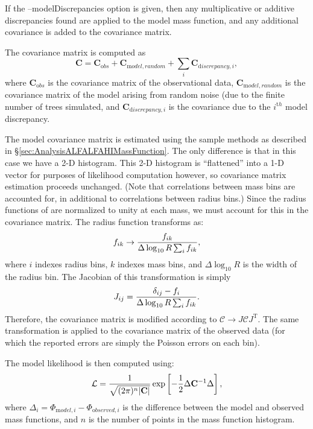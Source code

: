 If the {\normalfont \ttfamily --modelDiscrepancies} option is given, then any multiplicative or additive discrepancies found are applied to the model mass function, and any additional covariance is added to the covariance matrix.

The covariance matrix is computed as
\begin{equation}
 {\mathbf C} = {\mathbf C}_{\mathrm obs} + {\mathbf C}_{\mathrm model,random} + \sum_i {\mathbf C}_{{\mathrm discrepancy}, i},
\end{equation}
where ${\mathbf C}_{\mathrm obs}$ is the covariance matrix of the observational data, ${\mathbf C}_{\mathrm model,random}$ is the covariance matrix of the model arising from random noise (due to the finite number of trees simulated, and ${\mathbf C}_{{\mathrm discrepancy}, i}$ is the covariance due to the $i^{\mathrm th}$ model discrepancy.

The model covariance matrix is estimated using the sample methods as described in \S\ref{sec:AnalysisALFALFAHIMassFunction}. The only difference is that in this case we have a 2-D histogram. This 2-D histogram is ``flattened'' into a 1-D vector for purposes of likelihood computation however, so covariance matrix estimation proceeds unchanged. (Note that correlations between mass bins are accounted for, in additional to correlations between radius bins.) Since the radius functions of \cite{shen_size_2003} are normalized to unity at each mass, we must account for this in the covariance matrix. The radius function transforms as:
\begin{equation}
 f_{ik} \rightarrow {f_{ik} \over \Delta \log_{10} R \sum_i f_{ik} },
\end{equation}
where $i$ indexes radius bins, $k$ indexes mass bins, and $\Delta \log_{10} R$ is the width of the radius bin. The Jacobian of this transformation is simply
\begin{equation}
 J_{ij} = {\delta_{ij} - f_i \over  \Delta \log_{10} R \sum_i f_{ik}}.
\end{equation}
Therefore, the covariance matrix is modified according to $\mathcal{C} \rightarrow J \mathcal{C} J^{\mathrm T}$. The same transformation is applied to the covariance matrix of the observed data (for which the reported errors are simply the Poisson errors on each bin).

The model likelihood is then computed using:
\begin{equation}
 \mathcal{L} = {1 \over \sqrt{(2 \pi)^n |{\mathbf C}|}} \exp\left[ -{1\over 2} \Delta {\mathbf C}^{-1} \Delta \right],
\end{equation}
where $\Delta_i = \Phi_{{\mathrm model}, i} - \Phi_{{\mathrm observed}, i}$ is the difference between the model and observed mass functions, and $n$ is the number of points in the mass function histogram.

